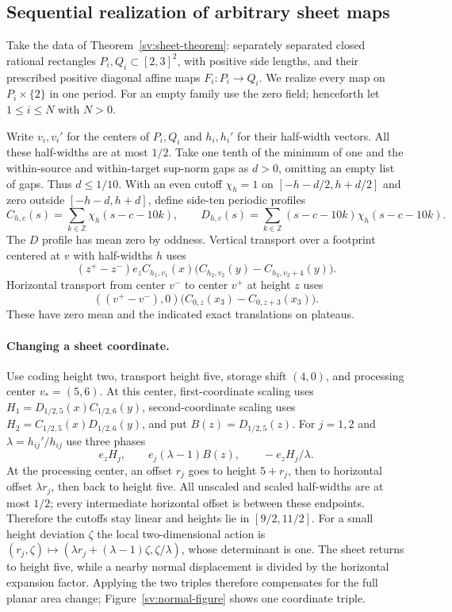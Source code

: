 \subsection{Sequential realization of arbitrary sheet maps}
\label{sv:storage}
Take the data of Theorem~\ref{sv:sheet-theorem}: separately separated
closed rational rectangles $P_i,Q_i\subset[2,3]^2$, with positive
side lengths, and their prescribed positive diagonal affine maps
$F_i:P_i\to Q_i$.  We realize every map on $P_i\times\{2\}$
in one period.  For an empty family use the zero field; henceforth let
$1\le i\le N$ with $N>0$.

Write $v_i,v_i'$ for the centers of $P_i,Q_i$ and $h_i,h_i'$ for
their half-width vectors.  All these half-widths are at most $1/2$.
Take one tenth of the minimum of one and the within-source and
within-target sup-norm gaps as $d>0$, omitting an empty list of
gaps.  Thus $d\le1/10$.  With an even cutoff
$\chi_h=1$ on $[-h-d/2,h+d/2]$ and zero outside
$[-h-d,h+d]$, define side-ten periodic profiles
\[
 C_{h,c}(s)=\sum_{k\in\mathbb Z}\chi_h(s-c-10k),\qquad
 D_{h,c}(s)=\sum_{k\in\mathbb Z}(s-c-10k)\chi_h(s-c-10k).
\]
The $D$ profile has mean zero by oddness.  Vertical transport over a
footprint centered at $v$ with half-widths $h$ uses
\[
 (z^+-z^-)e_z C_{h_1,v_1}(x)
       \bigl(C_{h_2,v_2}(y)-C_{h_2,v_2+4}(y)\bigr).
\]
Horizontal transport from center $v^-$ to center $v^+$ at height $z$ uses
\[
 ((v^+-v^-),0)\bigl(C_{0,z}(x_3)-C_{0,z+3}(x_3)\bigr).
\]
These have zero mean and the indicated exact translations on plateaus.

\paragraph{Changing a sheet coordinate.}
Use coding height two, transport height five, storage shift $(4,0)$,
and processing center $v_*=(5,6)$.  At this center, first-coordinate scaling
uses $H_1=D_{1/2,5}(x)C_{1/2,6}(y)$, second-coordinate scaling
uses $H_2=C_{1/2,5}(x)D_{1/2,6}(y)$, and put
$B(z)=D_{1/2,5}(z)$.  For $j=1,2$ and
$\lambda=h_{ij}'/h_{ij}$ use three phases
\begin{equation}\label{sv:storage-triple}
 e_zH_j,\qquad e_j(\lambda-1)B(z),\qquad -e_zH_j/\lambda.
\end{equation}
At the processing center, an offset $r_j$ goes to height $5+r_j$,
then to horizontal offset $\lambda r_j$, then back to height five.
All unscaled and scaled half-widths are at most $1/2$; every
intermediate horizontal offset is between these endpoints.  Therefore
the cutoffs stay linear and heights lie in $[9/2,11/2]$.
For a small height deviation $\zeta$ the local two-dimensional action
is $(r_j,\zeta)\mapsto(\lambda r_j+(\lambda-1)\zeta,
\zeta/\lambda)$, whose determinant is one.  The sheet returns to
height five, while a nearby normal displacement is divided by the
horizontal expansion factor.  Applying the two triples therefore
compensates for the full planar area change; Figure~\ref{sv:normal-figure}
shows one coordinate triple.

